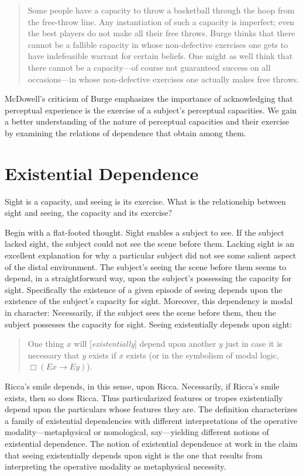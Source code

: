 \documentclass[12pt]{article}
\begin{document}
\begin{quote}
	Some people have a capacity to throw a basketball through the hoop from the free-throw line. Any instantiation of such a capacity is imperfect; even the best players do not make all their free throws. Burge thinks that there cannot be a fallible capacity in whose non-defective exercises one gets to have indefeasible warrant for certain beliefs. One might as well think that there cannot be a capacity---of course not guaranteed success on all occasions---in whose non-defective exercises one actually makes free throws. \citep[245--6]{McDowell:2010fk}
\end{quote}
McDowell's criticism of Burge emphasizes the importance of acknowledging that perceptual experience is the exercise of a subject's perceptual capacities. We gain a better understanding of the nature of perceptual capacities and their exercise by examining the relations of dependence that obtain among them.



\section{Existential Dependence} %
\label{sec:capacities_and_their_exercise}

Sight is a capacity, and seeing is its exercise. What is the relationship between sight and seeing, the capacity and its exercise?

Begin with a flat-footed thought. Sight enables a subject to see. If the subject lacked sight, the subject could not see the scene before them. Lacking sight is an excellent explanation for why a particular subject did not see some salient aspect of the distal environment. The subject's seeing the scene before them seems to depend, in a straightforward way, upon the subject's possessing the capacity for sight. Specifically the existence of a given episode of seeing depends upon the existence of the subject's capacity for sight. Moreover, this dependency is modal in character: Necessarily, if the subject sees the scene before them, then the subject possesses the capacity for sight. Seeing existentially depends upon sight:
\begin{quote}
    One thing \( x \) will [\emph{existentially}] depend upon another \( y \) just in case it is necessary that \( y \) exists if \( x \) exists (or in the symbolism of modal logic, \( \Box(Ex \rightarrow Ey) \)). \citep[270]{Fine:1995ls} 
\end{quote}
Ricca's smile depends, in this sense, upon Ricca. Necessarily, if Ricca's smile exists, then so does Ricca. Thus particularized features or tropes existentially depend upon the particulars whose features they are. The definition characterizes a family of existential dependencies with different interpretations of the operative modality---metaphysical or nomological, say---yielding different notions of existential dependence. The notion of existential dependence at work in the claim that seeing existentially depends upon sight is the one that results from interpreting the operative modality as metaphysical necessity.
\end{document}
